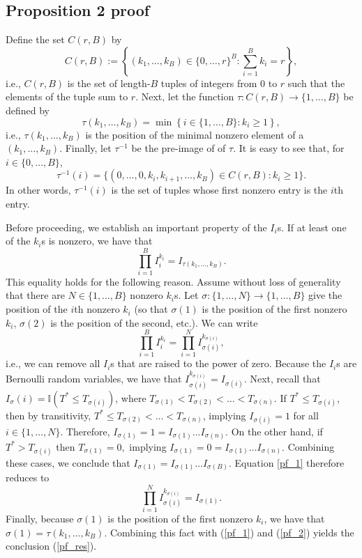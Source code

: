 \documentclass[12pt]{article}
\begin{document}
\printbibliography
\begin{appendices}
\subsection*{Proposition 2 proof}
Define the set $C(r,B)$ by
$$C(r,B) := \left\{ (k_1, \dots, k_B) \in \{0, \dots, r\}^B : \sum_{i=1}^B k_i = r \right\},$$ i.e., $C(r,B)$ is the set of length-$B$ tuples of integers from $0$ to $r$ such that the elements of the tuple sum to $r$. Next, let the function $\tau: C(r,B) \to \{ 1, \dots, B \}$ be defined by
$$ \tau(k_1, \dots, k_B) = \min\left\{ i \in \{ 1, \dots, B \} : k_i \geq 1 \right\},$$
i.e., $\tau(k_1, \dots, k_B)$ is the position of the minimal nonzero element of a $(k_1, \dots, k_B)$. Finally, let $\tau^{-1}$ be the pre-image of of $\tau$. It is easy to see that, for $i \in \{0, \dots, B\}$,
$$\tau^{-1}(i) = \{ (0, \dots, 0, k_i, k_{i+1}, \dots, k_B) \in C(r,B) : k_i \geq 1 \}.$$ In other words, $\tau^{-1}(i)$ is the set of tuples whose first nonzero entry is the $i$th entry. 

Before proceeding, we establish an important property of the $I_i$s. If at least one of the $k_i$s is nonzero, we have that
\begin{equation}\label{pf_res}
 \prod_{i=1}^B I^{k_i}_i = I_{\tau(k_1, \dots, k_B)}.
 \end{equation}
This equality holds for the following reason. Assume without loss of generality that there are $N \in \{1, \dots, B\}$ nonzero $k_i$s. Let $\sigma: \{1, \dots, N\} \to \{1, \dots, B\}$ give the position of the $i$th nonzero $k_i$ (so that $\sigma(1)$ is the position of the first nonzero $k_i$, $\sigma(2)$ is the position of the second, etc.). We can write
\begin{equation}\label{pf_1}
\prod_{i=1}^B I_i^{k_i} = \prod_{i=1}^N I_{\sigma(i)}^{k_{\sigma(i)}},
\end{equation} 
i.e., we can remove all $I_i$s that are raised to the power of zero. Because the $I_i$s are Bernoulli random variables, we have that $I_{\sigma(i)}^{ k_{\sigma(i)}} = I_{\sigma(i)}$. Next, recall that $I_\sigma(i) = \mathbb{I}\left( T^* \leq T_{\sigma(i)} \right)$, where $T_{\sigma(1)} < T_{\sigma(2)} < \dots < T_{\sigma(n)}.$ If $T^* \leq T_{\sigma(i)}$, then by transitivity, $T^* \leq T_{\sigma(2)} < \dots < T_{\sigma(n)}$, implying $I_{\sigma(i)} = 1$ for all $i \in \{1, \dots, N\}.$ Therefore, $I_{\sigma(1)} = 1 = I_{\sigma(1)} \dots I_{\sigma(n)}.$ On the other hand, if $T^* > T_{\sigma(i)}$ then $T_{\sigma(1)} = 0,$ implying $I_{\sigma(1)} = 0 = I_{\sigma(1)} \dots I_{\sigma(n)}$. Combining these cases, we conclude that $I_{\sigma(1)} = I_{\sigma(1)} \dots I_{\sigma(B)}$. Equation \ref{pf_1} therefore reduces to
\begin{equation}\label{pf_2}
\prod_{i=1}^N I_{\sigma(i)}^{k_{\sigma(i)}} = I_{\sigma(1)}.
\end{equation}
 Finally, because $\sigma(1)$ is the position of the first nonzero $k_i$, we have that $\sigma(1) = \tau(k_1, \dots, k_B).$ Combining this fact with (\ref{pf_1}) and (\ref{pf_2}) yields the conclusion (\ref{pf_res}).


\end{appendices}
\end{document}
